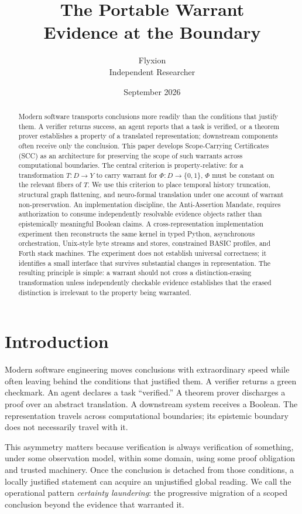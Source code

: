 \documentclass[11pt]{article}
\title{The Portable Warrant\\\large Evidence at the Boundary}
\author{Flyxion\\\small Independent Researcher}
\date{September 2026}
\begin{document}
\maketitle
\begin{abstract}
Modern software transports conclusions more readily than the conditions that justify them. A verifier returns success, an agent reports that a task is verified, or a theorem prover establishes a property of a translated representation; downstream components often receive only the conclusion. This paper develops Scope-Carrying Certificates (SCC) as an architecture for preserving the scope of such warrants across computational boundaries. The central criterion is property-relative: for a transformation $T:D\to Y$ to carry warrant for $\Phi:D\to\{0,1\}$, $\Phi$ must be constant on the relevant fibers of $T$. We use this criterion to place temporal history truncation, structural graph flattening, and neuro-formal translation under one account of warrant non-preservation. An implementation discipline, the Anti-Assertion Mandate, requires authorization to consume independently resolvable evidence objects rather than epistemically meaningful Boolean claims. A cross-representation implementation experiment then reconstructs the same kernel in typed Python, asynchronous orchestration, Unix-style byte streams and stores, constrained BASIC profiles, and Forth stack machines. The experiment does not establish universal correctness; it identifies a small interface that survives substantial changes in representation. The resulting principle is simple: a warrant should not cross a distinction-erasing transformation unless independently checkable evidence establishes that the erased distinction is irrelevant to the property being warranted.
\end{abstract}

\section{Introduction}
Modern software engineering moves conclusions with extraordinary speed while often leaving behind the conditions that justified them. A verifier returns a green checkmark. An agent declares a task ``verified.'' A theorem prover discharges a proof over an abstract translation. A downstream system receives a Boolean. The representation travels across computational boundaries; its epistemic boundary does not necessarily travel with it.

This asymmetry matters because verification is always verification of something, under some observation model, within some domain, using some proof obligation and trusted machinery. Once the conclusion is detached from those conditions, a locally justified statement can acquire an unjustified global reading. We call the operational pattern \emph{certainty laundering}: the progressive migration of a scoped conclusion beyond the evidence that warranted it.
\end{document}
